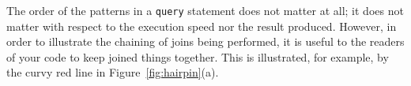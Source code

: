 \documentclass[10pt,letterpaper]{article} %
\newcommand{\stt}[1]{\texttt{#1}} %
\begin{document}
The order of the patterns in a \stt{query} statement does not matter at all; it does not matter with respect to the execution speed nor the result produced.
However, in order to illustrate the chaining of joins being performed, it is useful to the readers of your code to keep joined things together.
This is illustrated, for example, by the curvy red line in Figure~\ref{fig:hairpin}(a).


\end{document}
